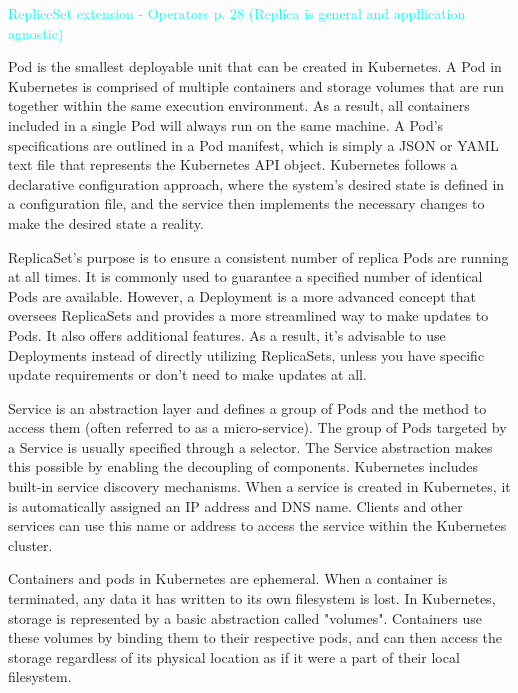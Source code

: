 \textcolor{cyan}{RepliceSet extension - Operators p. 28 (Replica is general and appllication agnostic) }

Pod is the smallest deployable unit that can be created in Kubernetes. \cite{docuKubePods} A Pod in Kubernetes is comprised of multiple containers and storage volumes that are run together within the same execution environment. As a result, all containers included in a single Pod will always run on the same machine. \cite{kubeUpAndRunningPods}
A Pod's specifications are outlined in a Pod manifest, which is simply a JSON or YAML text file that represents the Kubernetes API object. Kubernetes follows a declarative configuration approach, where the system's desired state is defined in a configuration file, and the service then implements the necessary changes to make the desired state a reality. \cite{docuKubeStaticPod}

ReplicaSet’s purpose is to ensure a consistent number of replica Pods are running at all times. It is commonly used to guarantee a specified number of identical Pods are available. However, a Deployment is a more advanced concept that oversees ReplicaSets and provides a more streamlined way to make updates to Pods. It also offers additional features. As a result, it's advisable to use Deployments instead of directly utilizing ReplicaSets, unless you have specific update requirements or don't need to make updates at all. \cite{docuKubeReplicaset}

Service is an abstraction layer and defines a group of Pods and the method to access them (often referred to as a micro-service). The group of Pods targeted by a Service is usually specified through a selector. The Service abstraction makes this possible by enabling the decoupling of components. \cite{docuKubeSevice} Kubernetes includes built-in service discovery mechanisms. When a service is created in Kubernetes, it is automatically assigned an IP address and DNS name. Clients and other services can use this name or address to access the service within the Kubernetes cluster. \cite{docuKubeSevice}

Containers and pods in Kubernetes are ephemeral. When a container is terminated, any data it has written to its own filesystem is lost. In Kubernetes, storage is represented by a basic abstraction called "volumes". Containers use these volumes by binding them to their respective pods, and can then access the storage regardless of its physical location as if it were a part of their local filesystem. \cite{masteringKubernetesStorage}

